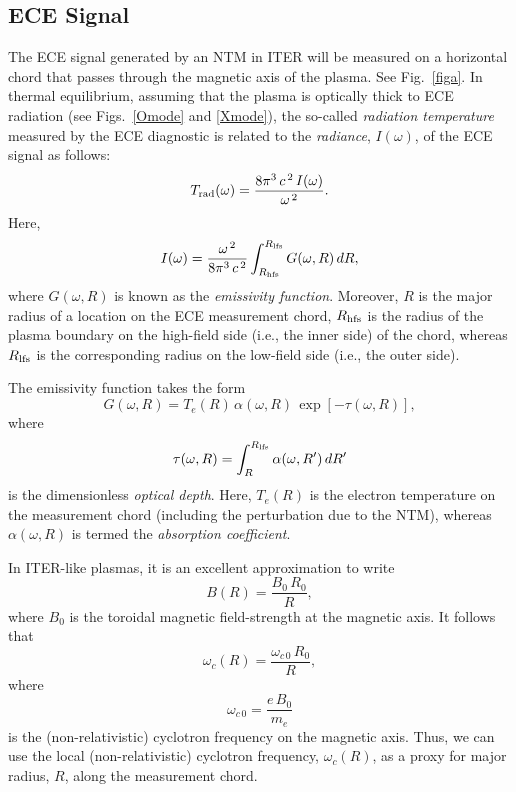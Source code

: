 \documentclass[12pt,prb,aps]{revtex4-1}
\begin{document}
\subsection{ECE Signal}
The ECE signal generated by an NTM in ITER will be  measured on a horizontal chord that passes through the magnetic axis of the plasma. See Fig.~\ref{figa}. 
In thermal equilibrium, assuming that the plasma is optically thick to ECE radiation (see Figs.~\ref{Omode} and \ref{Xmode}), the so-called {\em radiation temperature}\/ measured by the ECE diagnostic is related to the {\em radiance}, $I(\omega)$, of the ECE signal as follows:\,\cite{bornatici}
\begin{equation}\label{a8}
T_{\rm rad}(\omega)=\frac{8\pi^3\,c^{\,2}\, I(\omega)}{\omega^{\,2}}.
\end{equation}
Here,
\begin{equation}\label{a9}
I(\omega) = \frac{\omega^{\,2}}{8\pi^3\,c^{\,2}}\int_{R_{\rm hfs}}^{R_{\rm lfs}}G(\omega, R)\,dR,
\end{equation}
where $G(\omega,R)$ is known as the {\em emissivity function}. Moreover, $R$ is the major radius of a location on the ECE measurement chord, $R_{\rm hfs}$ is the radius
of the plasma boundary on the high-field side (i.e., the inner side) of the chord, whereas $R_{\rm lfs}$ is the corresponding radius 
on the low-field side (i.e., the outer side).

The emissivity function takes the form\,\cite{bornatici}
\begin{equation}\label{a10}
G(\omega, R) = T_e(R)\,\alpha(\omega,R)\,\exp\left[-\tau(\omega,R)\right],
\end{equation}
where 
\begin{equation}\label{a11}
\tau(\omega,R) = \int_R^{R_{\rm lfs}}\alpha(\omega,R')\,dR'
\end{equation}
is the dimensionless {\em optical depth}. 
Here, $T_e(R)$ is the electron temperature on the measurement chord (including the perturbation due to the NTM), whereas $\alpha(\omega,R)$
is termed the {\em absorption coefficient}.

In ITER-like plasmas, it is an excellent approximation to write
\begin{equation}
B(R) = \frac{B_0\,R_0}{R},
\end{equation}
where $B_0$ is the toroidal magnetic field-strength at the magnetic axis.  It follows that
\begin{equation}\label{a13}
\omega_c(R) = \frac{\omega_{c\,0}\,R_0}{R},
\end{equation}
where
\begin{equation}
\omega_{c\,0} = \frac{e\,B_0}{m_e}
\end{equation}
is the (non-relativistic) cyclotron frequency on the magnetic axis. Thus, we can use the local (non-relativistic) cyclotron frequency, $\omega_c(R)$, as a proxy for major radius, $R$,  along the measurement chord. 
\end{document}
